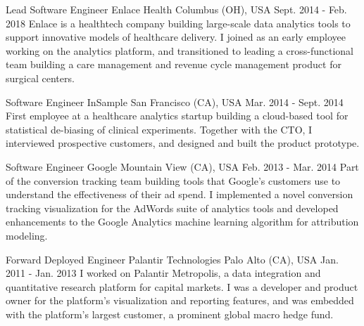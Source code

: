 \begin{cventries}
  \cventry
    {Lead Software Engineer} %
    {Enlace Health} %
    {Columbus (OH), USA} %
    {Sept. 2014 - Feb. 2018} %
    {
      Enlace is a healthtech company building large-scale data analytics tools to support innovative models of healthcare delivery. I joined as an early employee working on the analytics platform, and transitioned to leading a cross-functional team building a care management and revenue cycle management product for surgical centers.
    }

  \cventry
    {Software Engineer} %
    {InSample} %
    {San Francisco (CA), USA} %
    {Mar. 2014 - Sept. 2014} %
    {
      First employee at a healthcare analytics startup building a cloud-based tool for statistical de-biasing of clinical experiments. Together with the CTO, I interviewed prospective customers, and designed and built the product prototype.
      \vspace{3.0mm}
    }

  \cventry
    {Software Engineer} %
    {Google} %
    {Mountain View (CA), USA} %
    {Feb. 2013 - Mar. 2014} %
    {
      Part of the conversion tracking team building tools that Google's customers use to understand the effectiveness of their ad spend. I implemented a novel conversion tracking visualization for the AdWords suite of analytics tools and developed enhancements to the Google Analytics machine learning algorithm for attribution modeling.
      \vspace{3.0mm}
    }

  \cventry
    {Forward Deployed Engineer} %
    {Palantir Technologies} %
    {Palo Alto (CA), USA} %
    {Jan. 2011 - Jan. 2013} %
    {
      I worked on Palantir Metropolis, a data integration and quantitative research platform for capital markets. I was a developer and product owner for the platform's visualization and reporting features, and was embedded with the platform's largest customer, a prominent global macro hedge fund.
    }

\end{cventries}
